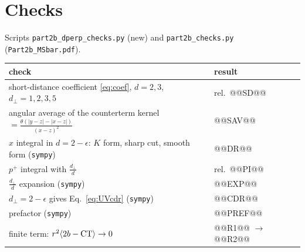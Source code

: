 \documentclass[10pt]{article}
\numberwithin{equation}{section}
\begin{document}
\section{Checks}
Scripts \texttt{part2b\_dperp\_checks.py} (new) and \texttt{part2b\_checks.py} (\texttt{Part2b\_MSbar.pdf}).
\begin{center}\small
\begin{tabular}{@{}p{}p{}@{}}\toprule
check & result\\\midrule
short-distance coefficient \eqref{eq:coef}, $d=2,3$, $d_\perp=1,2,3,5$ & rel.\ @@SD@@\\
angular average of the counterterm kernel $=\frac{\theta(|y-z|-|x-z|)}{(x-z)^2}$ & @@SAV@@\\
$x$ integral in $d=2-\epsilon$: $K$ form, sharp cut, smooth form (\texttt{sympy}) & @@DR@@\\
$p^+$ integral with $\frac{d_\perp}{d}$ & rel.\ @@PI@@\\
$\frac{d_\perp}{d}$ expansion (\texttt{sympy}) & @@EXP@@\\
$d_\perp=2-\epsilon$ gives Eq.~\eqref{eq:UVcdr} (\texttt{sympy}) & @@CDR@@\\
prefactor (\texttt{sympy}) & @@PREF@@\\
finite term: $r^2\langle2b-{\rm CT}\rangle\to0$ & @@R1@@ $\to$ @@R2@@\\\bottomrule
\end{tabular}
\end{center}
\end{document}
